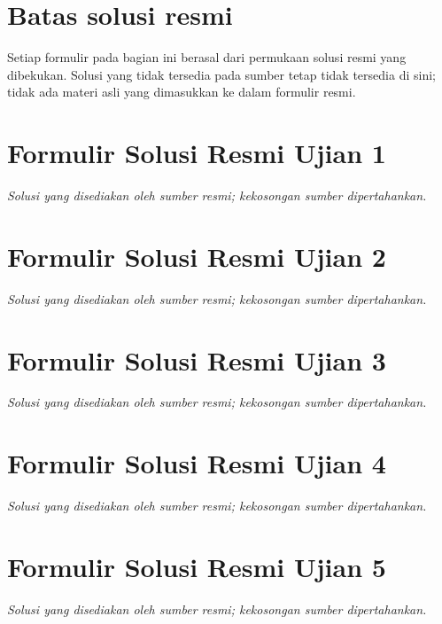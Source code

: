 \documentclass[11pt,a4paper,oneside]{book}
\begin{document}
\chapter*{Batas solusi resmi}
Setiap formulir pada bagian ini berasal dari permukaan solusi resmi yang dibekukan. Solusi yang tidak tersedia pada sumber tetap tidak tersedia di sini; tidak ada materi asli yang dimasukkan ke dalam formulir resmi.
\chapter{Formulir Solusi Resmi Ujian 1}
\noindent\textit{Solusi yang disediakan oleh sumber resmi; kekosongan sumber dipertahankan.}
\begingroup
\renewcommand{\theHfakt}{o011.exam.official.01.\arabic{fakt}}

\endgroup

\chapter{Formulir Solusi Resmi Ujian 2}
\noindent\textit{Solusi yang disediakan oleh sumber resmi; kekosongan sumber dipertahankan.}
\begingroup
\renewcommand{\theHfakt}{o011.exam.official.02.\arabic{fakt}}

\endgroup

\chapter{Formulir Solusi Resmi Ujian 3}
\noindent\textit{Solusi yang disediakan oleh sumber resmi; kekosongan sumber dipertahankan.}
\begingroup
\renewcommand{\theHfakt}{o011.exam.official.03.\arabic{fakt}}

\endgroup

\chapter{Formulir Solusi Resmi Ujian 4}
\noindent\textit{Solusi yang disediakan oleh sumber resmi; kekosongan sumber dipertahankan.}
\begingroup
\renewcommand{\theHfakt}{o011.exam.official.04.\arabic{fakt}}

\endgroup

\chapter{Formulir Solusi Resmi Ujian 5}
\noindent\textit{Solusi yang disediakan oleh sumber resmi; kekosongan sumber dipertahankan.}
\begingroup
\renewcommand{\theHfakt}{o011.exam.official.05.\arabic{fakt}}

\endgroup
\end{document}
